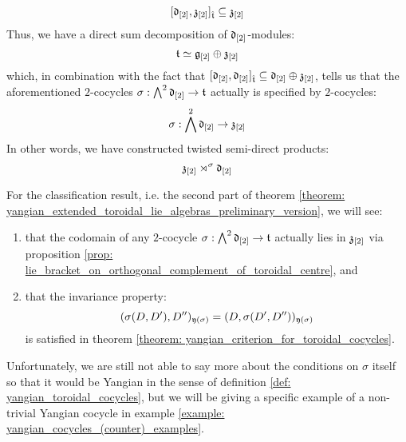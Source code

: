 \begin{enumerate}
                $$[\mathfrak{d}_{[2]}, \mathfrak{z}_{[2]}]_{\hat{\mathfrak{t}}} \subseteq \mathfrak{z}_{[2]}$$
            Thus, we have a direct sum decomposition of $\mathfrak{d}_{[2]}$-modules:
                $$\mathfrak{t} \simeq \mathfrak{g}_{[2]} \oplus \mathfrak{z}_{[2]}$$
            which, in combination with the fact that $[\mathfrak{d}_{[2]}, \mathfrak{d}_{[2]}]_{\hat{\mathfrak{t}}} \subseteq \mathfrak{d}_{[2]} \oplus \mathfrak{z}_{[2]}$, tells us that the aforementioned $2$-cocycles $\sigma: \bigwedge^2 \mathfrak{d}_{[2]} \to \mathfrak{t}$ actually is specified by $2$-cocycles:
                $$\sigma: \bigwedge^2 \mathfrak{d}_{[2]} \to \mathfrak{z}_{[2]}$$
            In other words, we have constructed twisted semi-direct products:
                $$\mathfrak{z}_{[2]} \rtimes^{\sigma} \mathfrak{d}_{[2]}$$
        \end{enumerate}

        For the classification result, i.e. the second part of theorem \ref{theorem: yangian_extended_toroidal_lie_algebras_preliminary_version}, we will see:
        \begin{enumerate}
            \item that the codomain of any $2$-cocycle $\sigma: \bigwedge^2 \mathfrak{d}_{[2]} \to \mathfrak{t}$ actually lies in $\mathfrak{z}_{[2]}$ via proposition \ref{prop: lie_bracket_on_orthogonal_complement_of_toroidal_centre}, and
            \item that the invariance property:
                $$(\sigma(D, D'), D'')_{\mathfrak{y}(\sigma)} = (D, \sigma(D', D''))_{\mathfrak{y}(\sigma)}$$
            is satisfied in theorem \ref{theorem: yangian_criterion_for_toroidal_cocycles}.
        \end{enumerate}
        Unfortunately, we are still not able to say more about the conditions on $\sigma$ itself so that it would be Yangian in the sense of definition \ref{def: yangian_toroidal_cocycles}, but we will be giving a specific example of a non-trivial Yangian cocycle in example \ref{example: yangian_cocycles_(counter)_examples}.